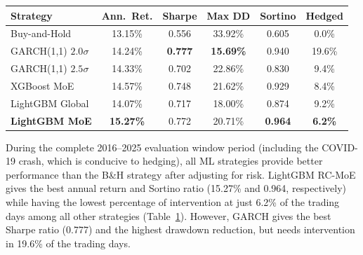 \documentclass[]{interact}
\begin{document}
\begin{table}[H]
{\renewcommand{\arraystretch}{1.25}
\setlength{\tabcolsep}{4pt}
\begin{tabular}{lccccc}
\toprule
\textbf{Strategy} & \textbf{Ann.\ Ret.} & \textbf{Sharpe} & \textbf{Max DD} & \textbf{Sortino} & \textbf{Hedged} \\
\midrule
Buy-and-Hold            & 13.15\% & 0.556 & 33.92\% & 0.605 &  0.0\% \\
\midrule
GARCH(1,1) $2.0\sigma$  & 14.24\% & \textbf{0.777} & \textbf{15.69\%} & 0.940 & 19.6\% \\
GARCH(1,1) $2.5\sigma$  & 14.33\% & 0.702 & 22.86\% & 0.830 &  9.4\% \\
\midrule
XGBoost MoE             & 14.57\% & 0.748 & 21.62\% & 0.929 &  8.4\% \\
LightGBM Global         & 14.07\% & 0.717 & 18.00\% & 0.874 &  9.2\% \\
\textbf{LightGBM MoE}   & \textbf{15.27\%} & 0.772 & 20.71\% & \textbf{0.964} & \textbf{6.2\%} \\
\bottomrule
\end{tabular}}
\label{tab:backtest}
\end{table}

During the complete 2016--2025 evaluation window period (including the COVID-19 crash, which is conducive to hedging), all ML strategies provide better performance than the B\&H strategy after adjusting for risk. LightGBM RC-MoE gives the best annual return and Sortino ratio (15.27\% and 0.964, respectively) while having the lowest percentage of intervention at just 6.2\% of the trading days among all other strategies (Table~\ref{tab:backtest}). However, GARCH gives the best Sharpe ratio (0.777) and the highest drawdown reduction, but needs intervention in 19.6\% of the trading days.
\end{document}
